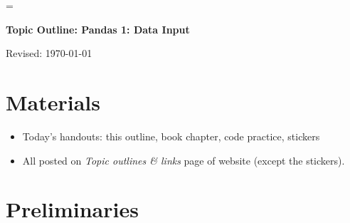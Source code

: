 \documentclass[11pt]{article}
\begin{document}
\parskip=\bigskipamount
\parindent=0.0in
\thispagestyle{empty}


\bigskip\bigskip
\centerline{\Large \bf Topic Outline:  Pandas 1:  Data Input}
\centerline{Revised: \today}


\section*{Materials}

\begin{itemize}
\item  Today's handouts:  this outline, book chapter, code practice, stickers
\item  All posted on {\it Topic outlines \& links\/} page of website (except the stickers).
\end{itemize}


\section*{Preliminaries}
\end{document}
